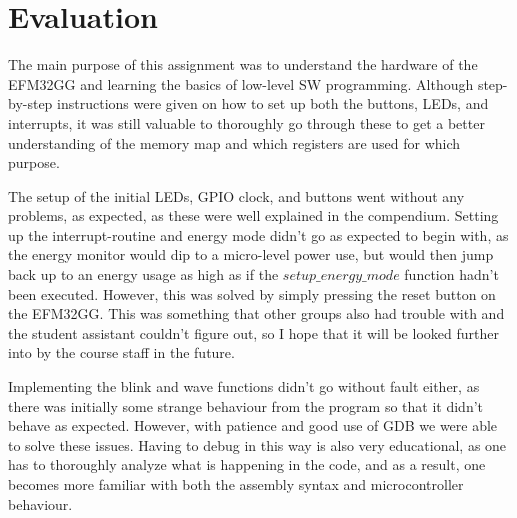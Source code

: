 \section{Evaluation}

The main purpose of this assignment was to understand the hardware of the EFM32GG and learning the basics of low-level SW programming. Although step-by-step instructions were given on how to set up both the buttons, LEDs, and interrupts, it was still valuable to thoroughly go through these to get a better understanding of the memory map and which registers are used for which purpose.

The setup of the initial LEDs, GPIO clock, and buttons went without any problems, as expected, as these were well explained in the compendium\cite{compendium}. Setting up the interrupt-routine and energy mode didn't go as expected to begin with, as the energy monitor would dip to a micro-level power use, but would then jump back up to an energy usage as high as if the $setup\_energy\_mode$ function hadn't been executed. However, this was solved by simply pressing the reset button on the EFM32GG. This was something that other groups also had trouble with and the student assistant couldn't figure out, so I hope that it will be looked further into by the course staff in the future.

Implementing the blink and wave functions didn't go without fault either, as there was initially some strange behaviour from the program so that it didn't behave as expected. However, with patience and good use of GDB we were able to solve these issues. Having to debug in this way is also very educational, as one has to thoroughly analyze what is happening in the code, and as a result, one becomes more familiar with both the assembly syntax and microcontroller behaviour.